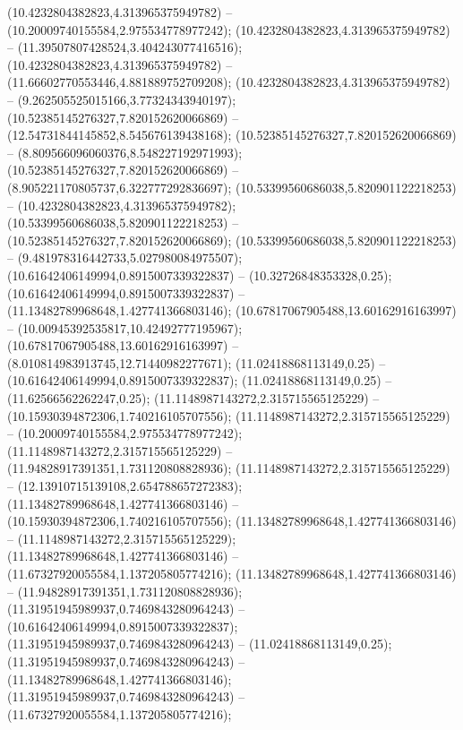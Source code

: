  (10.4232804382823,4.313965375949782) -- (10.20009740155584,2.975534778977242);
 (10.4232804382823,4.313965375949782) -- (11.39507807428524,3.404243077416516);
 (10.4232804382823,4.313965375949782) -- (11.66602770553446,4.881889752709208);
 (10.4232804382823,4.313965375949782) -- (9.262505525015166,3.77324343940197);
 (10.52385145276327,7.820152620066869) -- (12.54731844145852,8.545676139438168);
 (10.52385145276327,7.820152620066869) -- (8.809566096060376,8.548227192971993);
 (10.52385145276327,7.820152620066869) -- (8.905221170805737,6.322777292836697);
 (10.53399560686038,5.820901122218253) -- (10.4232804382823,4.313965375949782);
 (10.53399560686038,5.820901122218253) -- (10.52385145276327,7.820152620066869);
 (10.53399560686038,5.820901122218253) -- (9.481978316442733,5.027980084975507);
 (10.61642406149994,0.8915007339322837) -- (10.32726848353328,0.25);
 (10.61642406149994,0.8915007339322837) -- (11.13482789968648,1.427741366803146);
 (10.67817067905488,13.60162916163997) -- (10.00945392535817,10.42492777195967);
 (10.67817067905488,13.60162916163997) -- (8.010814983913745,12.71440982277671);
 (11.02418868113149,0.25) -- (10.61642406149994,0.8915007339322837);
 (11.02418868113149,0.25) -- (11.62566562262247,0.25);
 (11.1148987143272,2.315715565125229) -- (10.15930394872306,1.740216105707556);
 (11.1148987143272,2.315715565125229) -- (10.20009740155584,2.975534778977242);
 (11.1148987143272,2.315715565125229) -- (11.94828917391351,1.731120808828936);
 (11.1148987143272,2.315715565125229) -- (12.13910715139108,2.654788657272383);
 (11.13482789968648,1.427741366803146) -- (10.15930394872306,1.740216105707556);
 (11.13482789968648,1.427741366803146) -- (11.1148987143272,2.315715565125229);
 (11.13482789968648,1.427741366803146) -- (11.67327920055584,1.137205805774216);
 (11.13482789968648,1.427741366803146) -- (11.94828917391351,1.731120808828936);
 (11.31951945989937,0.7469843280964243) -- (10.61642406149994,0.8915007339322837);
 (11.31951945989937,0.7469843280964243) -- (11.02418868113149,0.25);
 (11.31951945989937,0.7469843280964243) -- (11.13482789968648,1.427741366803146);
 (11.31951945989937,0.7469843280964243) -- (11.67327920055584,1.137205805774216);
